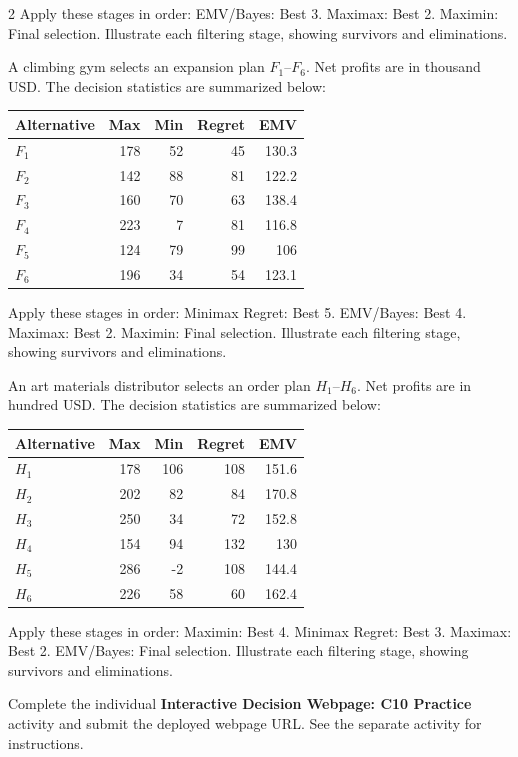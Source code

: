 \begin{multicols}{2}
\noindent Apply these stages in order: EMV/Bayes: Best 3. Maximax: Best 2. Maximin: Final selection.
Illustrate each filtering stage, showing survivors and eliminations.

A climbing gym selects an expansion plan $F_1$--$F_6$. Net profits are in thousand USD. The decision statistics are summarized below:
\vspace{-4mm}
\begin{center}\small\setlength{\tabcolsep}{4pt}
	\begin{tabular}{lrrrr}\toprule
		Alternative & Max & Min & Regret & EMV\\ \midrule
		$F_1$ & 178 & 52 & 45 & 130.3\\
		$F_2$ & 142 & 88 & 81 & 122.2\\
		$F_3$ & 160 & 70 & 63 & 138.4\\
		$F_4$ & 223 & 7 & 81 & 116.8\\
		$F_5$ & 124 & 79 & 99 & 106\\
		$F_6$ & 196 & 34 & 54 & 123.1\\
		\bottomrule
	\end{tabular}
\end{center}
\vspace{-3mm}
\noindent Apply these stages in order: Minimax Regret: Best 5. EMV/Bayes: Best 4. Maximax: Best 2. Maximin: Final selection.
Illustrate each filtering stage, showing survivors and eliminations.

An art materials distributor selects an order plan $H_1$--$H_6$. Net profits are in hundred USD. The decision statistics are summarized below:
\vspace{-3mm}
\begin{center}\small\setlength{\tabcolsep}{4pt}
	\begin{tabular}{lrrrr}\toprule
		Alternative & Max & Min & Regret & EMV\\ \midrule
		$H_1$ & 178 & 106 & 108 & 151.6\\
		$H_2$ & 202 & 82 & 84 & 170.8\\
		$H_3$ & 250 & 34 & 72 & 152.8\\
		$H_4$ & 154 & 94 & 132 & 130\\
		$H_5$ & 286 & -2 & 108 & 144.4\\
		$H_6$ & 226 & 58 & 60 & 162.4\\
		\bottomrule
	\end{tabular}
\end{center}
\vspace{-3mm}
\noindent Apply these stages in order: Maximin: Best 4. Minimax Regret: Best 3. Maximax: Best 2. EMV/Bayes: Final selection.
Illustrate each filtering stage, showing survivors and eliminations.

\par
{}
		Complete the individual \textbf{Interactive Decision Webpage: C10 Practice} activity and submit the deployed webpage URL. See the separate activity for instructions.
		
	\end{multicols}

